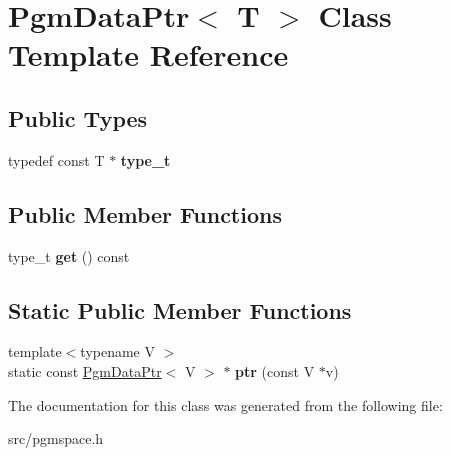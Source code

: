 \hypertarget{classPgmDataPtr}{}\section{Pgm\+Data\+Ptr$<$ T $>$ Class Template Reference}
\label{classPgmDataPtr}
\subsection*{Public Types}
\begin{DoxyCompactItemize}
\item 
\hypertarget{classPgmDataPtr_a1c723887632424e9f6fb422cf3725d5b}{}\label{classPgmDataPtr_a1c723887632424e9f6fb422cf3725d5b} 
typedef const T $\ast$ {\bfseries type\+\_\+t}
\end{DoxyCompactItemize}
\subsection*{Public Member Functions}
\begin{DoxyCompactItemize}
\item 
\hypertarget{classPgmDataPtr_a81d95a9f569ab29401a005395df50257}{}\label{classPgmDataPtr_a81d95a9f569ab29401a005395df50257} 
type\+\_\+t {\bfseries get} () const
\end{DoxyCompactItemize}
\subsection*{Static Public Member Functions}
\begin{DoxyCompactItemize}
\item 
\hypertarget{classPgmDataPtr_a4ca4a1c1032d8f8092fc2b46426e2566}{}\label{classPgmDataPtr_a4ca4a1c1032d8f8092fc2b46426e2566} 
{\footnotesize template$<$typename V $>$ }\\static const \hyperlink{classPgmDataPtr}{Pgm\+Data\+Ptr}$<$ V $>$ $\ast$ {\bfseries ptr} (const V $\ast$v)
\end{DoxyCompactItemize}


The documentation for this class was generated from the following file\+:\begin{DoxyCompactItemize}
\item 
src/pgmspace.\+h\end{DoxyCompactItemize}
